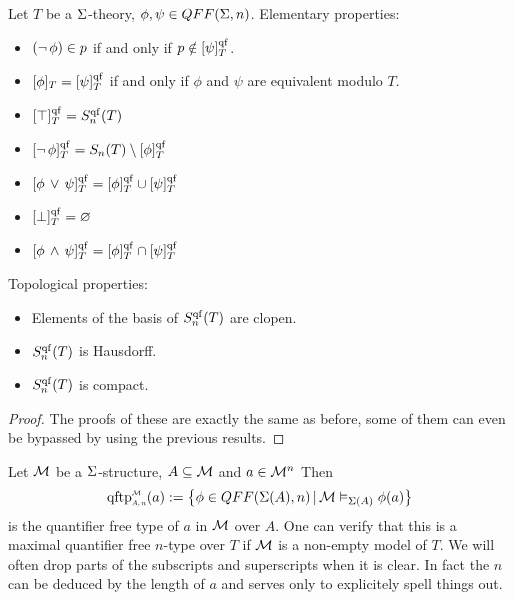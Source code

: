 \begin{prop}
    Let $T$ be a $\Sigma$-theory, $\phi, \psi \in QFF(\Sigma,n)$.
    Elementary properties:
    \begin{itemize}
        \item $(\neg\, \phi) \in p$ if and only if $p \notin [\psi]_T^{\operatorname{qf}}$.
        \item $[\phi]_T = [\psi]_T^{\operatorname{qf}}$ if and only if $\phi$ and $\psi$ are 
            equivalent modulo $T$.
        \item $[\top]_T^{\operatorname{qf}} = S_n^{\operatorname{qf}}(T)$
        \item $[\neg\, \phi]_T^{\operatorname{qf}} = S_n(T) \setminus [\phi]_T^{\operatorname{qf}}$
        \item $[\phi \, \lor \, \psi]_T^{\operatorname{qf}} = [\phi]_T^{\operatorname{qf}} \cup [\psi]_T^{\operatorname{qf}}$
        \item $[\bot]_T^{\operatorname{qf}} = \varnothing$
        \item $[\phi \, \land \, \psi]_T^{\operatorname{qf}} = [\phi]_T^{\operatorname{qf}} \cap [\psi]_T^{\operatorname{qf}}$
    \end{itemize}
    Topological properties:
    \begin{itemize}
        \item Elements of the basis of $S_n^{\operatorname{qf}}(T)$ are clopen.
        \item $S_n^{\operatorname{qf}}(T)$ is Hausdorff.
        \item $S_n^{\operatorname{qf}}(T)$ is compact.
    \end{itemize}
\end{prop}
\begin{proof}
    The proofs of these are exactly the same as before, 
    some of them can even be bypassed by using the previous results.
\end{proof}

\begin{dfn}
    Let $\mathcal{M}$ be a $\Sigma$-structure, 
    $A \subseteq {\mathcal{M}}$ and $a \in {\mathcal{M}}^n$
    Then 
    \[\subintp{A,n}{\MM}{\qftp}(a) := 
    \set{\phi \in QFF(\Si(A),n) \st \MM \model{\Si(A)} \phi(a)}\]
    is the quantifier free type of $a$ in $\mathcal{M}$ over $A$.
    One can verify that this is a maximal quantifier free $n$-type over $T$
    if $\mathcal{M}$ is a non-empty model of $T$.
    We will often drop parts of the subscripts and superscripts when it is
    clear. 
    In fact the $n$ can be deduced by the length of $a$ 
    and serves only to explicitely spell things out.
\end{dfn}